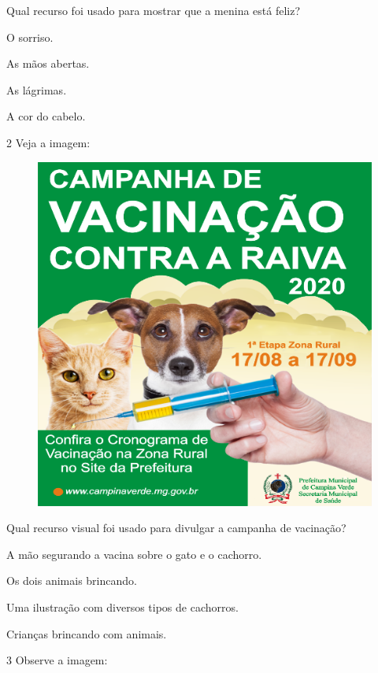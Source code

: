 Qual recurso foi usado para mostrar que a menina está feliz?

\begin{escolha}
\item O sorriso.

\item As mãos abertas.

\item As lágrimas.

\item A cor do cabelo.
\end{escolha}

\num{2} Veja a imagem:

\begin{figure}[htpb!]
\centering
\includegraphics[width=.4\textwidth]{media/image137.png}
\end{figure}

\pagebreak

Qual recurso visual foi usado para divulgar a campanha de vacinação?

\begin{escolha}
\item A mão segurando a vacina sobre o gato e o cachorro.

\item Os dois animais brincando.

\item Uma ilustração com diversos tipos de cachorros.

\item Crianças brincando com animais.
\end{escolha}

\num{3} Observe a imagem:

